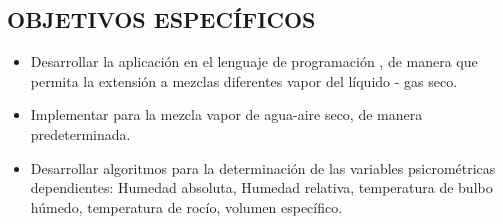     \subsection{OBJETIVOS ESPECÍFICOS}
        \begin{itemize}
            
            \item Desarrollar la aplicación en el lenguaje de programación \ldp, de manera que permita la extensión a mezclas diferentes vapor del líquido - gas seco.
            \item Implementar para la mezcla vapor de agua-aire seco, de manera predeterminada.
            \item Desarrollar algoritmos para la determinación de las variables psicrométricas dependientes: Humedad absoluta, Humedad relativa, temperatura de bulbo húmedo, temperatura de rocío, volumen específico. 
            
            


            


\end{itemize}

